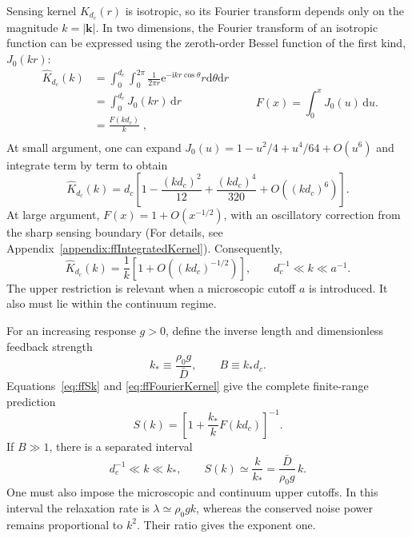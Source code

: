\documentclass{article}
\begin{document}
Sensing kernel $ K_{d_c}(r) $ is isotropic, so its Fourier transform depends only on the magnitude $k=|\mathbf k|$. In two dimensions, the Fourier transform of an isotropic function can be expressed using the zeroth-order Bessel function of the first kind, $J_0(kr)$:
\begin{equation}
    \begin{aligned}
        \widehat{K}_{d_c}(k)&=\int_0^{d_c}{\int_0^{2\pi}{\frac{1}{2\pi r}\mathrm{e}^{-\mathrm{i}kr\cos \theta}r\mathrm{d}\theta \mathrm{d}r}}\\
        &=\int_0^{d_c}{J_0(kr)\,\mathrm{d}r}\\
        &=\frac{F(kd_c)}{k}\;,\\
    \end{aligned}
    \qquad 
    F(x)=\int_0^xJ_0(u)\,\mathrm du.
    \label{eq:ffFourierKernel}
\end{equation}
At small argument, one can expand $J_0(u)=1-u^2/4+u^4/64+O(u^6)$ and integrate term by term to obtain
\begin{equation}
    \widehat K_{d_c}(k)
    =d_c\left[1-\frac{(kd_c)^2}{12}+\frac{(kd_c)^4}{320}
    +O((kd_c)^6)\right].
    \label{eq:ffKernelSmall}
\end{equation}
At large argument, $F(x)=1+O(x^{-1/2})$, with an oscillatory correction from the sharp sensing boundary (For details, see Appendix~\ref{appendix:ffIntegratedKernel}). Consequently,
\begin{equation}
    \widehat K_{d_c}(k)=\frac1k[1+O((kd_c)^{-1/2})],
    \qquad d_c^{-1}\ll k\ll a^{-1}.
    \label{eq:ffKernelIntermediate}
\end{equation}
The upper restriction is relevant when a microscopic cutoff $a$ is introduced. It also must lie within the continuum regime.

For an increasing response $g>0$, define the inverse length and dimensionless feedback strength
\begin{equation}
    k_*\equiv\frac{\rho_0g}{\bar D},\qquad B\equiv k_*d_c.
\end{equation}
Equations~\eqref{eq:ffSk} and \eqref{eq:ffFourierKernel} give the complete finite-range prediction
\begin{equation}
    \boxed{S(k)=\left[1+\frac{k_*}{k}F(kd_c)\right]^{-1}.}
    \label{eq:ffFiniteRangeSk}
\end{equation}
If $B\gg1$, there is a separated interval
\begin{equation}
    \boxed{d_c^{-1}\ll k\ll k_*,\qquad
    S(k)\simeq\frac{k}{k_*}=\frac{\bar D}{\rho_0g}\,k.}
    \label{eq:ffLinearScaling}
\end{equation}
One must also impose the microscopic and continuum upper cutoffs. In this interval the relaxation rate is $\lambda\simeq\rho_0gk$, whereas the conserved noise power remains proportional to $k^2$. Their ratio gives the exponent one.  
\end{document}
